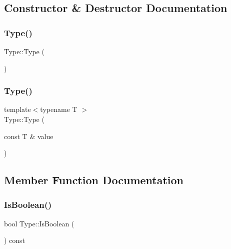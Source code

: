 \subsection{Constructor \& Destructor Documentation}
\mbox{\label{class_type_a78339313d36891f18427c431ea84e306}} 
\subsubsection{\texorpdfstring{Type()}{Type()}\hspace{0.1cm}{\footnotesize\ttfamily [1/2]}}
{\footnotesize\ttfamily Type\+::\+Type (\begin{DoxyParamCaption}{ }\end{DoxyParamCaption})}

\mbox{\label{class_type_aba2b55a99317139e0e5b272695b34a2b}} 
\subsubsection{\texorpdfstring{Type()}{Type()}\hspace{0.1cm}{\footnotesize\ttfamily [2/2]}}
{\footnotesize\ttfamily template$<$typename T $>$ \\
Type\+::\+Type (\begin{DoxyParamCaption}\item[{const T \&}]{value }\end{DoxyParamCaption})\hspace{0.3cm}{\ttfamily [inline]}}



\subsection{Member Function Documentation}
\mbox{\label{class_type_ae6f13d051ad6e6bef19f2501b6d4405d}} 
\subsubsection{\texorpdfstring{Is\+Boolean()}{IsBoolean()}}
{\footnotesize\ttfamily bool Type\+::\+Is\+Boolean (\begin{DoxyParamCaption}{ }\end{DoxyParamCaption}) const}

